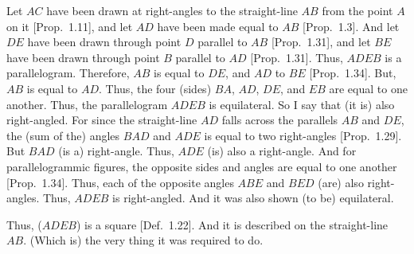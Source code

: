 \begin{Parallel}{}{}
{Let $AC$ have been drawn at right-angles to the straight-line $AB$
from the point $A$ on it [Prop.~1.11], and let $AD$ have been
made equal to $AB$ [Prop.~1.3]. And let $DE$ have been drawn
through point $D$ parallel to $AB$ [Prop.~1.31], and let $BE$ have been
drawn through point $B$ parallel to $AD$ [Prop.~1.31]. Thus,
$ADEB$ is a parallelogram. Therefore, $AB$ is equal to $DE$, and $AD$ to $BE$ [Prop.~1.34]. But, $AB$ is equal to $AD$. Thus, the four (sides) $BA$, $AD$, $DE$, and $EB$ are equal to one another. Thus, the parallelogram $ADEB$ is equilateral.
So I say that (it is) also right-angled. For since the straight-line $AD$ falls
across the parallels $AB$ and $DE$, the (sum of the) angles $BAD$ and $ADE$ is
equal to two right-angles [Prop.~1.29]. But $BAD$ (is a) right-angle. Thus,
$ADE$ (is) also a right-angle. And for parallelogrammic figures, the opposite
sides and angles are equal to one another [Prop.~1.34]. Thus, each of the
opposite angles $ABE$ and $BED$ (are) also right-angles. Thus, $ADEB$ is
right-angled. And it was also shown (to be) equilateral.

\epsfysize=2.5in
\centerline{}

Thus, ($ADEB$) is a square [Def.~1.22]. And it is described on the straight-line $AB$. (Which is) the very thing it was required to do.}
\end{Parallel}

